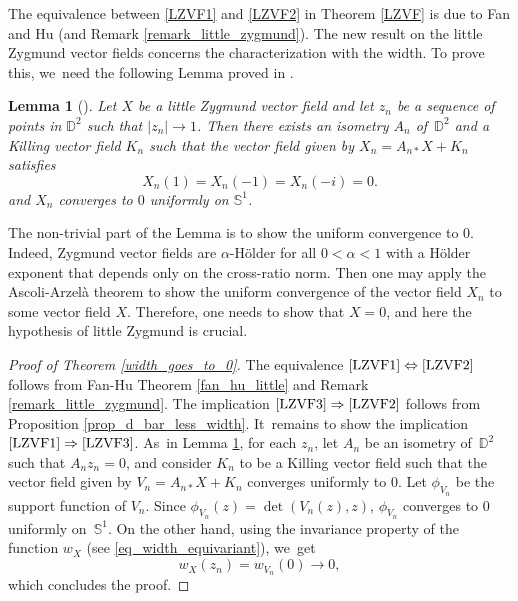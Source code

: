 \documentclass[10pt]{amsart}
\theoremstyle{plain}
\newtheorem{lemma}[cor]{Lemma}
\theoremstyle{definition}
\begin{document}
The equivalence between \eqref{LZVF1} and \eqref{LZVF2} in Theorem \ref{LZVF} is due to Fan and Hu \cite{FanJun} (and Remark \ref{remark_little_zygmund}). The new result on the little Zygmund vector fields concerns the characterization with the width. To prove this, we~need the following Lemma proved in \cite{FanJun}.

\begin{lemma}[{\cite[p.\,1167]{FanJun}}]
\label{teck_little}
Let $X$ be a little Zygmund vector field and let $z_n$ be a sequence of points in $\mathbb{D}^2$ such that $\lvert z_n\rvert\to1$. Then there exists an isometry $A_n$ of~$\mathbb{D}^2$ and a Killing vector field $K_n$ such that the vector field given by $X_n=A_{n*}X+K_n$ satisfies\vspace*{-3pt}
\[
X_n(1)=X_n(-1)=X_n(-i)=0.
\]
and $X_n$ converges to $0$ uniformly on $\mathbb{S}^1$.
\end{lemma}

The non-trivial part of the Lemma is to show the uniform convergence to $0$. Indeed, Zygmund vector fields are $\alpha$-Hölder for all $0<\alpha<1$ with a Hölder exponent that depends only on the cross-ratio norm. Then one may apply the Ascoli-Arzelà theorem to show the uniform convergence of the vector field $X_n$ to some vector field $X$. Therefore, one needs to show that $X=0$, and here the hypothesis of little Zygmund is crucial.

\begin{proof}[Proof of Theorem \ref{width_goes_to_0}]
The equivalence $\eqref{LZVF1}\Leftrightarrow\eqref{LZVF2}$ follows from Fan-Hu Theorem \ref{fan_hu_little} and Remark \ref{remark_little_zygmund}. The implication $\eqref{LZVF3}\Rightarrow\eqref{LZVF2}$ follows from Proposition \ref{prop_d_bar_less_width}. It~remains to show the implication $\eqref{LZVF1}\Rightarrow\eqref{LZVF3}$. As~in Lemma \ref{teck_little}, for each $z_n$, let $A_n$ be an isometry of~$\mathbb{D}^2$ such that $A_nz_n=0$, and consider $K_n$ to be a Killing vector field such that the vector field given by $V_n=A_{n*}X+K_n$ converges uniformly to $0$.
Let \(\phi_{V_n}\) be the support function of \(V_n\). Since \(\phi_{V_n}(z) = \det(V_n(z), z)\), \(\phi_{V_n}\) converges to \(0\) uniformly on~\(\mathbb{S}^1\). On the other hand, using the invariance property of the function \(w_X\) (see \eqref{eq_width_equivariant}), we~get
\[ w_X(z_n) = w_{V_n}(0) \to 0, \]
which concludes the proof.
\end{proof}
\end{document}
